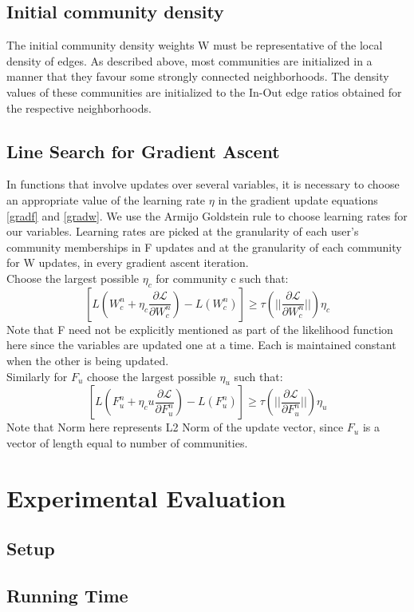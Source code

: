 \documentclass[11pt]{article}
\begin{document}
\subsection*{Initial community density}
The initial community density weights W must be representative of the local density of edges. As described above, most communities are initialized in a manner that they favour some strongly connected neighborhoods. The density values of these communities are initialized to the In-Out edge ratios obtained for the respective neighborhoods.

\subsection*{Line Search for Gradient Ascent}
In functions that involve updates over several variables, it is necessary to choose an appropriate value of the learning rate $\eta$ in the gradient update equations \ref{gradf} and \ref{gradw}. We use the Armijo Goldstein rule to choose learning rates for our variables. Learning rates are picked at the granularity of each user's community memberships in F updates and at the granularity of each community for W updates, in every gradient ascent iteration.
\\[3pt]
Choose the largest possible $\eta_c$ for community c such that:
$$[L(W_{c}^n  + \eta_c	 \frac{\partial \mathcal{L}}{\partial W_{c}^n}) - L(W_{c}^n)]  \geq \tau(||\frac{\partial \mathcal{L}}{\partial W_{c}^n}||)\eta_c$$
Note that F need not be explicitly mentioned as part of the likelihood function here since the variables are updated one at a time. Each is maintained constant when the other is being updated.
\\[5pt]
Similarly for $F_{u}$ choose the largest possible $\eta_u$ such that:
$$[L(F_{u}^n  + \eta_cu \frac{\partial \mathcal{L}}{\partial F_{u}^n}) - L(F_{u}^n)]  \geq \tau(||\frac{\partial \mathcal{L}}{\partial F_{u}^n}||)\eta_u$$
Note that Norm here represents L2 Norm of the update vector, since $F_{u}$ is a vector of length equal to number of communities.
\section{Experimental Evaluation}
\subsection{Setup}
\subsection{Running Time}
\end{document}
